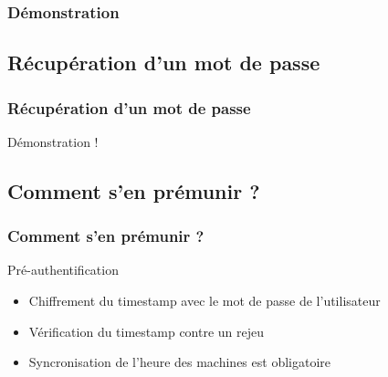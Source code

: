\documentclass[svgnames]{beamer}
\begin{document}
\begin{frame}
  \frametitle{Démonstration}
\end{frame}

\subsection{Récupération d'un mot de passe}
\begin{frame}
 \frametitle{Récupération d'un mot de passe}
 
 \begin{center}
  Démonstration !
  
 \end{center}
\end{frame}


\subsection{Comment s'en prémunir ?}

\begin{frame}
 \frametitle{Comment s'en prémunir ?}
 
 \begin{block}{Pré-authentification}
  \begin{itemize}
   \item Chiffrement du timestamp avec le mot de passe de l'utilisateur
   \item Vérification du timestamp contre un rejeu
   \item Syncronisation de l'heure des machines est obligatoire
  \end{itemize}
 \end{block}
\end{frame}


\end{document}
